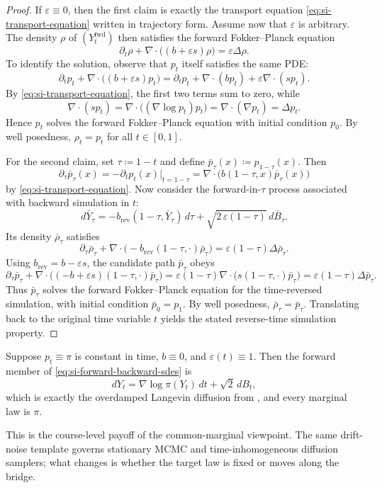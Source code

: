 \begin{proof}
If \(\varepsilon\equiv 0\), then the first claim is exactly the transport equation \eqref{eq:si-transport-equation} written in trajectory form.
Assume now that \(\varepsilon\) is arbitrary.
The density \(\rho\) of \((Y_t^{\mathrm{fwd}})\) then satisfies the forward Fokker--Planck equation
\[
  \partial_t \rho + \nabla\cdot\bigl((b+\varepsilon s)\rho\bigr) = \varepsilon \Delta\rho.
\]
To identify the solution, observe that \(p_t\) itself satisfies the same PDE:
\[
  \partial_t p_t + \nabla\cdot\bigl((b+\varepsilon s)p_t\bigr)
  =
  \partial_t p_t + \nabla\cdot(bp_t) + \varepsilon\nabla\cdot(sp_t).
\]
By \eqref{eq:si-transport-equation}, the first two terms sum to zero, while
\[
  \nabla\cdot(sp_t)
  =
  \nabla\cdot\bigl((\nabla\log p_t)p_t\bigr)
  =
  \nabla\cdot(\nabla p_t)
  =
  \Delta p_t.
\]
Hence \(p_t\) solves the forward Fokker--Planck equation with initial condition \(p_0\).
By well posedness, \(\rho_t=p_t\) for all \(t\in[0,1]\).

For the second claim, set \(\tau\coloneqq 1-t\) and define \(\bar p_\tau(x)\coloneqq p_{1-\tau}(x)\).
Then
\[
  \partial_\tau \bar p_\tau(x)
  =
  -\partial_t p_t(x)\vert_{t=1-\tau}
  =
  \nabla\cdot\bigl(b(1-\tau,x)\bar p_\tau(x)\bigr)
\]
by \eqref{eq:si-transport-equation}.
Now consider the forward-in-\(\tau\) process associated with backward simulation in \(t\):
\[
  d\bar Y_\tau
  =
  -b_{\mathrm{rev}}(1-\tau,\bar Y_\tau)\,d\tau
  +
  \sqrt{2\,\varepsilon(1-\tau)}\,d\bar B_\tau.
\]
Its density \(\bar \rho_\tau\) satisfies
\[
  \partial_\tau \bar \rho_\tau
  +
  \nabla\cdot\bigl(-b_{\mathrm{rev}}(1-\tau,\cdot)\bar \rho_\tau\bigr)
  =
  \varepsilon(1-\tau)\Delta\bar \rho_\tau.
\]
Using \(b_{\mathrm{rev}}=b-\varepsilon s\), the candidate path \(\bar p_\tau\) obeys
\[
  \partial_\tau \bar p_\tau
  +
  \nabla\cdot\bigl((-b+\varepsilon s)(1-\tau,\cdot)\bar p_\tau\bigr)
  =
  \varepsilon(1-\tau)\nabla\cdot\bigl(s(1-\tau,\cdot)\bar p_\tau\bigr)
  =
  \varepsilon(1-\tau)\Delta\bar p_\tau.
\]
Thus \(\bar p_\tau\) solves the forward Fokker--Planck equation for the time-reversed simulation, with initial condition \(\bar p_0=p_1\).
By well posedness, \(\bar \rho_\tau=\bar p_\tau\).
Translating back to the original time variable \(t\) yields the stated reverse-time simulation property.
\end{proof}

\begin{corollary}
\label{cor:langevin-stationary-path}
Suppose \(p_t\equiv \pi\) is constant in time, \(b\equiv 0\), and \(\varepsilon(t)\equiv 1\).
Then the forward member of \eqref{eq:si-forward-backward-sdes} is
\[
  dY_t = \nabla\log \pi(Y_t)\,dt + \sqrt{2}\,dB_t,
\]
which is exactly the overdamped Langevin diffusion from , and every marginal law is \(\pi\).
\end{corollary}
This is the course-level payoff of the common-marginal viewpoint.
The same drift-noise template governs stationary MCMC and time-inhomogeneous diffusion samplers; what changes is whether the target law is fixed or moves along the bridge.

